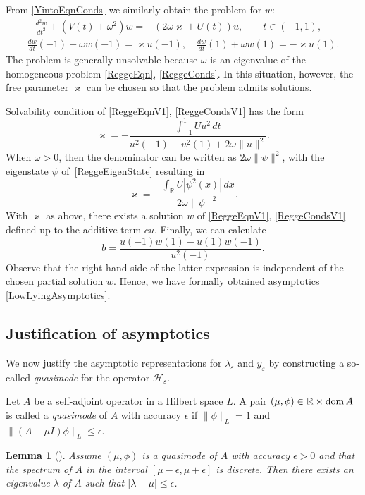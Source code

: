 \documentclass[reqno]{amsart}
\newtheorem{lem}{Lemma}
\theoremstyle{definition}
\theoremstyle{remark}
\numberwithin{equation}{section}
\newcommand{\dmn}{\mathop{\rm dom}}
\renewcommand{\kappa}{\varkappa}
\newcommand{\Real}{\mathbb R}
\newcommand{\eps}{\varepsilon}
\newcommand{\cH}{\mathcal{H}}
\begin{document}
From \eqref{YintoEqnConds} we similarly obtain the problem for $w$:
\begin{gather}\label{ReggeEqnV1}
  -\frac{d^2 w }{dt^2}+(V(t)+\omega^2)w =-(2\omega\kappa+U(t))u, \qquad t\in(-1,1),
  \\\label{ReggeCondsV1}
  \frac{dw }{dt}(-1)-\omega w (-1)=\kappa u(-1),\quad \frac{dw }{dt}(1)+\omega w (1)=-\kappa u(1).
\end{gather}
The problem is  generally unsolvable because $\omega$ is an eigenvalue of the homogeneous problem \eqref{ReggeEqn}, \eqref{ReggeConds}. In this situation, however, the free parameter $\kappa$ can be chosen so that the problem admits solutions.



Solvability condition of  \eqref{ReggeEqnV1}, \eqref{ReggeCondsV1} has the form
\begin{equation*}
  \kappa=-\frac{\int_{-1}^1Uu^2\,dt}{u^2(-1)+u^2(1)+2\omega\|u\|^2}.
\end{equation*}
When $\omega>0$, then the denominator can be written as $2\omega \|\psi\|^2$, with the eigenstate $\psi$ of~\eqref{ReggeEigenState} resulting in
\[
	\kappa = -\frac{\int_{\Real} U |\psi^2(x)|\,dx}{2 \omega \|\psi\|^2}.
\]
With $\kappa$ as above, there exists a solution $w$ of \eqref{ReggeEqnV1}, \eqref{ReggeCondsV1} defined up to the additive term $cu$. Finally, we can calculate
\begin{equation*}
 b=\frac{u(-1)w (1)-u(1)w (-1)}{u^2(-1)}.
\end{equation*}
Observe that the right hand side of the latter expression is independent of the chosen partial solution $w$. Hence, we have formally obtained asymptotics \eqref{LowLyingAsymptotics}.


\subsection{Justification of asymptotics}
We now justify the asymptotic representations for $\lambda_\eps$ and $y_\eps$ by constructing a so-called \emph{quasimode} for the operator $\cH_\eps$.

Let $A$ be a self-adjoint operator in a Hilbert space $L$. A pair $(\mu, \phi)\in \Real\times \dmn A$ is called a \emph{quasimode} of $A$ with accuracy $\epsilon$ if $\|\phi\|_L = 1$ and $\|(A-\mu I)\phi\|_L \leq \epsilon$.

\begin{lem}[]
	Assume $(\mu, \phi)$ is a quasimode of $A$ with accuracy $\epsilon>0$  and that the spectrum of $A$ in  the interval
	$[\mu-\epsilon, \mu+\epsilon]$ is discrete. Then there exists an eigenvalue $\lambda$ of $A$ such that $|\lambda-\mu|\leq\epsilon$.
\end{lem}
\end{document}
